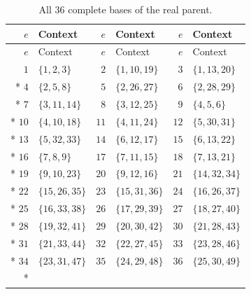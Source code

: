 \documentclass[aps,pra,reprint,superscriptaddress,longbibliography,nofootinbib,floatfix,10pt]{revtex4-2}
\theoremstyle{definition}
\begin{document}
\begin{longtable}{rlrlrl}
\caption{All 36 complete bases of the real parent.}\label{tab:bub49-contexts}\\
\toprule
$e$ & Context & $e$ & Context & $e$ & Context\\\midrule
\endfirsthead
\toprule
$e$ & Context & $e$ & Context & $e$ & Context\\\midrule
\endhead
\bottomrule\endfoot
$1$ & $\{1,2,3\}$ & $2$ & $\{1,10,19\}$ & $3$ & $\{1,13,20\}$\\*
$4$ & $\{2,5,8\}$ & $5$ & $\{2,26,27\}$ & $6$ & $\{2,28,29\}$\\*
$7$ & $\{3,11,14\}$ & $8$ & $\{3,12,25\}$ & $9$ & $\{4,5,6\}$\\*
$10$ & $\{4,10,18\}$ & $11$ & $\{4,11,24\}$ & $12$ & $\{5,30,31\}$\\*
$13$ & $\{5,32,33\}$ & $14$ & $\{6,12,17\}$ & $15$ & $\{6,13,22\}$\\*
$16$ & $\{7,8,9\}$ & $17$ & $\{7,11,15\}$ & $18$ & $\{7,13,21\}$\\*
$19$ & $\{9,10,23\}$ & $20$ & $\{9,12,16\}$ & $21$ & $\{14,32,34\}$\\*
$22$ & $\{15,26,35\}$ & $23$ & $\{15,31,36\}$ & $24$ & $\{16,26,37\}$\\*
$25$ & $\{16,33,38\}$ & $26$ & $\{17,29,39\}$ & $27$ & $\{18,27,40\}$\\*
$28$ & $\{19,32,41\}$ & $29$ & $\{20,30,42\}$ & $30$ & $\{21,28,43\}$\\*
$31$ & $\{21,33,44\}$ & $32$ & $\{22,27,45\}$ & $33$ & $\{23,28,46\}$\\*
$34$ & $\{23,31,47\}$ & $35$ & $\{24,29,48\}$ & $36$ & $\{25,30,49\}$\\*
\end{longtable}
\endgroup
\end{document}
